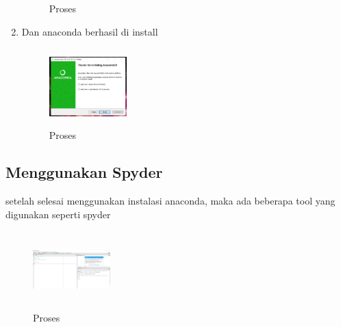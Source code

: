 \begin{enumerate}
\begin{figure}[!htbp]
        \caption{Proses}
        \label{awal}
        \end{figure}
    \item  Dan anaconda berhasil di install
    \begin{figure}[!htbp]
        \centering
        \includegraphics[width=3cm,height=3cm]{figures/jonviter/9.png}
        \caption{Proses}
        \label{awal}
        \end{figure}
\end{enumerate}
\subsection{Menggunakan Spyder}
setelah selesai menggunakan instalasi anaconda,  maka ada beberapa tool yang digunakan seperti spyder
\begin{figure}[!htbp]
        \centering
        \includegraphics[width=3cm,height=3cm]{figures/jonviter/10.png}
        \caption{Proses}
        \label{awal}
        \end{figure}



